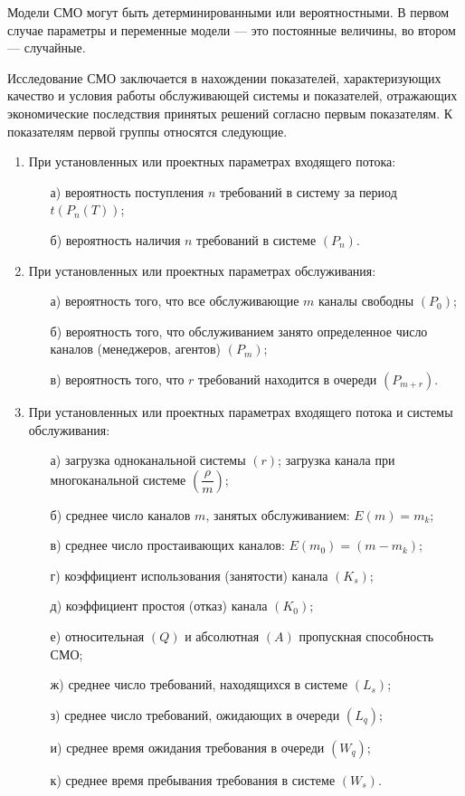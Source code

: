 Модели СМО могут быть детерминированными или вероятностными. В первом случае параметры и переменные модели --- это постоянные величины, во втором --- случайные.

Исследование СМО заключается в нахождении показателей, характеризующих качество и условия работы обслуживающей системы и показателей, отражающих экономические последствия принятых решений согласно первым показателям. К показателям первой группы относятся следующие.

\begin{enumerate}
	\item При установленных или проектных параметрах входящего потока:
		\begin{itemize}
			\item [а)] вероятность поступления $n$ требований в систему за период $t(P_n(T))$;
			\item [б)] вероятность наличия $n$ требований в системе $(P_n).$
		\end{itemize}
	\item При установленных или проектных параметрах обслуживания:
	\begin{itemize}
		\item [а)] вероятность того, что все обслуживающие $m$ каналы свободны $(P_0)$;
		\item [б)] вероятность того, что обслуживанием занято определенное число каналов (менеджеров, агентов) $(P_m)$;
		\item [в)] вероятность того, что $r$ требований находится в очереди $(P_{m+r})$.
	\end{itemize}
	\item При установленных или проектных параметрах входящего потока и системы обслуживания:
	\begin{itemize}
		\item [а)] загрузка одноканальной системы $ (r) $; загрузка канала при многоканальной системе $(\dfrac{\rho}{m})$;
		\item [б)] среднее число каналов $m  $, занятых обслуживанием: $E(m) = m_k  $;
		\item [в)] среднее число простаивающих каналов: $ E(m_0) = (m - m_k) $;
		\item [г)] коэффициент использования (занятости) канала $ (K_s) $;
		\item [д)] коэффициент простоя (отказ) канала $ (K_0) $;
		\item [е)]относительная $ (Q) $ и абсолютная $(A)  $ пропускная способность СМО;
		\item [ж)] среднее число требований, находящихся в системе $(L_s)  $;
		\item [з)] среднее число требований, ожидающих в очереди $ (L_q) $;
		\item [и)] среднее время ожидания требования в очереди $ (W_q) $;
		\item [к)] среднее время пребывания требования в системе $  (W_s)$.
	\end{itemize}
\end{enumerate}

